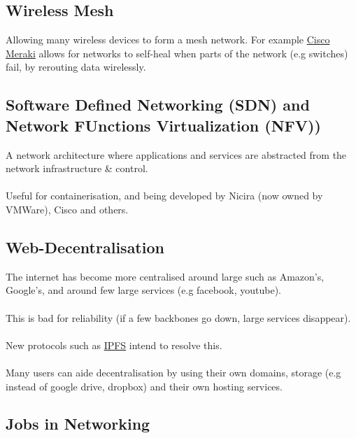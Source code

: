 \documentclass{report}
\begin{document}
\subsection*{Wireless Mesh}
Allowing many wireless devices to form a mesh network. For example \href{https://meraki.cisco.com/en-uk/}{Cisco Meraki} 
allows for networks to self-heal when parts of the network (e.g switches) fail, by rerouting data wirelessly.

\subsection*{Software Defined Networking (SDN) and Network FUnctions Virtualization (NFV))}
A network architecture where applications and services are abstracted from the network infrastructure \& control.
\\
\\ Useful for containerisation, and being developed by Nicira (now owned by VMWare), Cisco and others.

\subsection*{Web-Decentralisation}
The internet has become more centralised around large  such as Amazon's, Google's, and around few large services (e.g facebook, youtube).
\\
\\ This is bad for reliability (if a few backbones go down, large services disappear). 
\\
\\ New protocols such as \href{https://ipfs.io/}{IPFS} intend to resolve this.
\\
\\ Many users can aide decentralisation by using their own domains, storage (e.g instead of google drive, dropbox) and their own hosting services.

\subsection*{Jobs in Networking}
\end{document}
